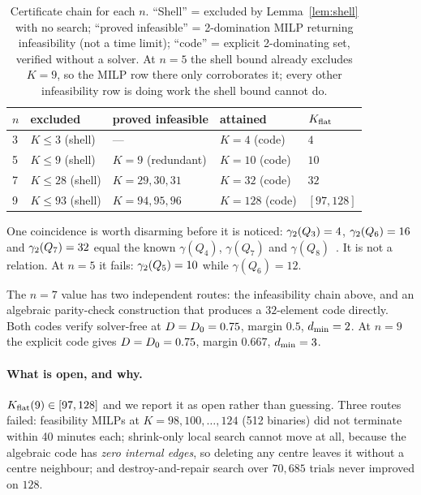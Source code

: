 \begin{table}[t]
\centering
\caption{Certificate chain for each $n$. ``Shell'' = excluded by
Lemma~\ref{lem:shell} with no search; ``proved infeasible'' = 2-domination MILP
returning infeasibility (not a time limit); ``code'' = explicit 2-dominating set,
verified without a solver. At $n = 5$ the shell bound already excludes $K = 9$,
so the MILP row there only corroborates it; every other infeasibility row is
doing work the shell bound cannot do.}
\label{tab:certificates}
\begin{tabular}{@{}lllll@{}}
\toprule
$n$ & excluded & proved infeasible & attained & $K_{\mathrm{flat}}$ \\
\midrule
3 & $K \le 3$ (shell)  & ---                 & $K=4$ (code)   & $4$ \\
5 & $K \le 9$ (shell)  & $K = 9$ (redundant) & $K=10$ (code)  & $10$ \\
7 & $K \le 28$ (shell) & $K = 29,30,31$      & $K=32$ (code)  & $32$ \\
9 & $K \le 93$ (shell) & $K = 94,95,96$      & $K=128$ (code) & $[97,128]$ \\
\bottomrule
\end{tabular}
\end{table}

One coincidence is worth disarming before it is noticed: $\gamma_2(Q_3) = 4$,
$\gamma_2(Q_6) = 16$ and $\gamma_2(Q_7) = 32$ equal the known $\gamma(Q_4)$,
$\gamma(Q_7)$ and $\gamma(Q_8)$~\cite{ostergardblass2001}. It is not a relation.
At $n = 5$ it fails: $\gamma_2(Q_5) = 10$ while $\gamma(Q_6) = 12$.

The $n = 7$ value has two independent routes: the infeasibility chain above, and
an algebraic parity-check construction that produces a $32$-element code
directly. Both codes verify solver-free at $D = D_0 = 0.75$, margin $0.5$,
$d_{\min} = 2$. At $n = 9$ the explicit code gives $D = D_0 = 0.75$, margin
$0.667$, $d_{\min} = 3$.

\paragraph{What is open, and why.}
$K_{\mathrm{flat}}(9) \in [97,128]$ and we report it as open rather than guessing. Three
routes failed: feasibility MILPs at $K = 98,100,\dots,124$ (512 binaries) did not
terminate within 40 minutes each; shrink-only local search cannot move at all,
because the algebraic code has \emph{zero internal edges}, so deleting any centre
leaves it without a centre neighbour; and destroy-and-repair search over
$70{,}685$ trials never improved on $128$.

